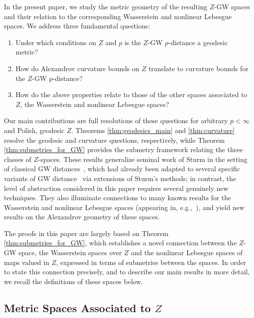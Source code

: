 \documentclass{article}
\theoremstyle{definition}
\begin{document}
In the present paper, we study the metric geometry of the resulting $Z$-GW spaces and their relation to the corresponding Wasserstein and nonlinear Lebesgue spaces. We address three fundamental questions:
\begin{enumerate}
\item Under which conditions on $Z$ and $p$ is the $Z$-GW $p$-distance a geodesic metric?
\item How do Alexandrov curvature bounds on $Z$ translate to curvature bounds for the $Z$-GW $p$-distance?
\item How do the above properties relate to those of the other spaces associated to $Z$, the Wasserstein and nonlinear Lebesgue spaces?
\end{enumerate}
Our main contributions are full resolutions of these questions for arbitrary $p < \infty$ and Polish, geodesic $Z$. Theorems \ref{thm:geodesics_main} and \ref{thm:curvature} resolve the geodesic and curvature questions, respectively, while Theorem \ref{thm:submetries_for_GW} provides the submetry framework relating the three classes of $Z$-spaces. These results generalize seminal work of Sturm in the setting of classical GW distances~\cite{sturm2020}, which had already been adapted to several specific variants of GW distance~\cite{chowdhury2020gromov,Chowdhury2023HypergraphCOT,zhang2024geometry,zhang2025topological}  via extensions of Sturm's methods; in contrast, the level of abstraction considered in this paper requires several genuinely new techniques.  They also illuminate connections to many known results for the Wasserstein and nonlinear Lebesgue spaces (appearing in, e.g.,~\cite{korevaar1993sobolev,jost1994equilibrium,sturm2001nonlinear,serieys2025nonlinear,serieys2026nonlinear}), and yield new results on the Alexandrov geometry of these spaces.

The proofs in this paper are largely based on Theorem \ref{thm:submetries_for_GW}, which establishes a novel connection between the $Z$-GW space, the Wasserstein spaces over $Z$ and the nonlinear Lebesgue spaces of maps valued in $Z$, expressed in terms of submetries between the spaces. In order to state this connection precisely, and to describe our main results in more detail, we recall the definitions of these spaces below.  

\subsection{Metric Spaces Associated to \texorpdfstring{$Z$}{Z}}
\end{document}
